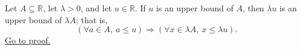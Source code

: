 \begin{proposition}
\label{prop:positive-dilation-preserves-upper-bounds}
Let $A\subseteq\mathbb{R}$, let $\lambda>0$, and let $u\in\mathbb{R}$.
If $u$ is an upper bound of $A$, then $\lambda u$ is an upper bound of
$\lambda A$; that is,
\[
\left(\forall a\in A,\ a\leq u\right)
\Longrightarrow
\left(\forall x\in\lambda A,\ x\leq \lambda u\right).
\]
\hyperref[prf:positive-dilation-preserves-upper-bounds]{Go to proof.}
\end{proposition}